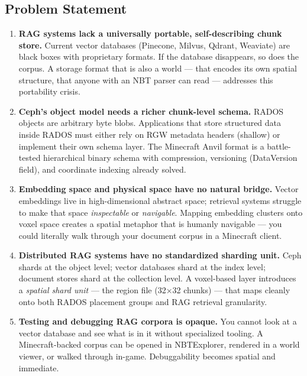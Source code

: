 \documentclass[11pt,letterpaper]{article}
\begin{document}
\subsection{Problem Statement}

\begin{enumerate}
  \item \textbf{RAG systems lack a universally portable, self-describing chunk store.} Current vector databases (Pinecone, Milvus, Qdrant, Weaviate) are black boxes with proprietary formats. If the database disappears, so does the corpus. A storage format that is also a world --- that encodes its own spatial structure, that anyone with an NBT parser can read --- addresses this portability crisis.

  \item \textbf{Ceph's object model needs a richer chunk-level schema.} RADOS objects are arbitrary byte blobs. Applications that store structured data inside RADOS must either rely on RGW metadata headers (shallow) or implement their own schema layer. The Minecraft Anvil format is a battle-tested hierarchical binary schema with compression, versioning (DataVersion field), and coordinate indexing already solved.

  \item \textbf{Embedding space and physical space have no natural bridge.} Vector embeddings live in high-dimensional abstract space; retrieval systems struggle to make that space \textit{inspectable} or \textit{navigable}. Mapping embedding clusters onto voxel space creates a spatial metaphor that is humanly navigable --- you could literally walk through your document corpus in a Minecraft client.

  \item \textbf{Distributed RAG systems have no standardized sharding unit.} Ceph shards at the object level; vector databases shard at the index level; document stores shard at the collection level. A voxel-based layer introduces a \textit{spatial shard unit} --- the region file (32×32 chunks) --- that maps cleanly onto both RADOS placement groups and RAG retrieval granularity.

  \item \textbf{Testing and debugging RAG corpora is opaque.} You cannot look at a vector database and see what is in it without specialized tooling. A Minecraft-backed corpus can be opened in NBTExplorer, rendered in a world viewer, or walked through in-game. Debuggability becomes spatial and immediate.
\end{enumerate}
\end{document}
